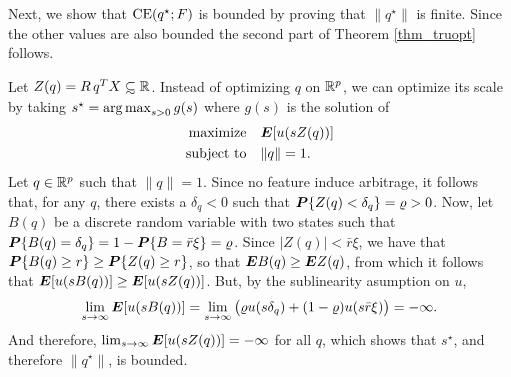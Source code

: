 Next, we show that $\operatorname{CE}(q^\star;F)$ is bounded by proving that $\|q^\star\|$ is
finite. Since the other values are also bounded the second part of Theorem
\ref{thm_truopt} follows.

Let $Z(q)=R\,q^TX\subsetsim\real$. Instead of optimizing $q$ on $\mathbb{R}^p$, we can optimize
its scale by taking $s^\star = \operatorname*{arg\,max}_{s>0}g(s)$ where $g(s)$ is the solution of
\begin{align*}
  \maximizeEquationSt{\E[u(sZ(q))]}[\|q\|= 1].
\end{align*}
Let $q\in\mathbb{R}^p$ such that $\|q\|=1$. Since no feature induce arbitrage, it follows that,
for any $q$, there exists a $\delta_q<0$ such that $\bm P\{Z(q)<\delta_q\}=\varrho>0$. Now,
let $B(q)$ be a discrete random variable with two states such that
$\bm P\{B(q)=\delta_q\}=1-\bm P\{B=\bar r\xi\}=\varrho$. Since $|Z(q)|<\bar r\xi$, we have
that $\bm P\{B(q)\geq r\} \geq \bm P\{Z(q)\geq r\}$, so that $\bm E B(q) \geq \bm E Z(q)$, from which
it follows that $\bm E[u(sB(q))]\geq \bm E[u(sZ(q))]$. But, by the sublinearity asumption on
$u$, 
\[
  \lim_{s\to\infty}\bm E[u(sB(q))] = \lim_{s\to\infty}\big(\varrho
  u(s\delta_q)+(1-\varrho)u(s\bar r\xi)\big) = -\infty.
\]
And therefore, $\lim_{s\to\infty}\bm E[u(sZ(q))]=-\infty$ for all $q$, which shows that
$s^\star$, and therefore $\|q^\star\|$, is bounded.






